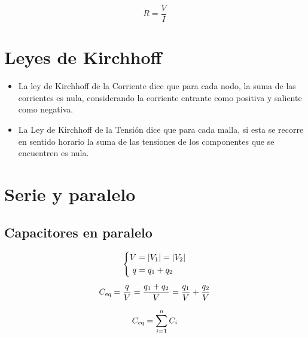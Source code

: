 \begin{mdframed}[style=DefinitionFrame]
    \begin{defn}
    \end{defn}
    \begin{equation*}
        R = \frac{V}{I}
    \end{equation*}
\end{mdframed}


\section{Leyes de Kirchhoff}

\begin{itemize}
\item La ley de Kirchhoff de la Corriente dice que para cada nodo, la suma de las corrientes es nula, considerando la corriente entrante como positiva y saliente como negativa.

\item La Ley de Kirchhoff de la Tensión dice que para cada malla, si esta se recorre en sentido horario la suma de las tensiones de los componentes que se encuentren es nula.
\end{itemize}


\section{Serie y paralelo}


\subsection{Capacitores en paralelo}

\begin{gather*}
    \left\{
    \begin{aligned}
        V &= {\left| {V_1} \right|} = {\left| {V_2} \right|}
        \\
        q &= q_1 + q_2
    \end{aligned}
    \right.
    \\[1ex]
    {{C}_\textsl{{eq}}} = \frac{q}{V} = \frac{q_1 + q_2}{V} = \frac{q_1}{V} + \frac{q_2}{V}
\end{gather*}

\begin{mdframed}[style=PropertyFrame]
    \begin{prop}
    \end{prop}
    \begin{equation*}
        {{C}_\textsl{{eq}}} = \sum_{i=1}^n C_i
    \end{equation*}
\end{mdframed}


